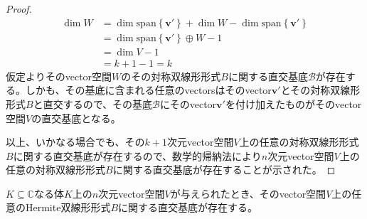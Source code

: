 \documentclass[dvipdfmx]{jsarticle}
\begin{document}
\begin{proof}
\begin{align*}
\dim W &= \dim{{\mathrm{span}}\left\{ \mathbf{v}' \right\}} + \dim W - \dim{{\mathrm{span}}\left\{ \mathbf{v}' \right\}}\\
&= \dim{{\mathrm{span}}\left\{ \mathbf{v}' \right\} \oplus W} - 1\\
&= \dim V - 1\\
&= k + 1 - 1 = k
\end{align*}
仮定よりそのvector空間$W$のその対称双線形形式$B$に関する直交基底$\mathcal{B}$が存在する。しかも、その基底に含まれる任意のvectorsはそのvector$\mathbf{v}'$とその対称双線形形式$B$と直交するので、その基底$\mathcal{B}$にそのvector$\mathbf{v}'$を付け加えたものがそのvector空間$V$の直交基底となる。\par
以上、いかなる場合でも、その$k + 1$次元vector空間$V$上の任意の対称双線形形式$B$に関する直交基底が存在するので、数学的帰納法により$n$次元vector空間$V$上の任意の対称双線形形式$B$に関する直交基底が存在することが示された。
\end{proof}
\begin{thm}\label{2.3.5.12}
$K \subseteq \mathbb{C}$なる体$K$上の$n$次元vector空間$V$が与えられたとき、そのvector空間$V$上の任意のHermite双線形形式$B$に関する直交基底が存在する。
\end{thm}
\end{document}
